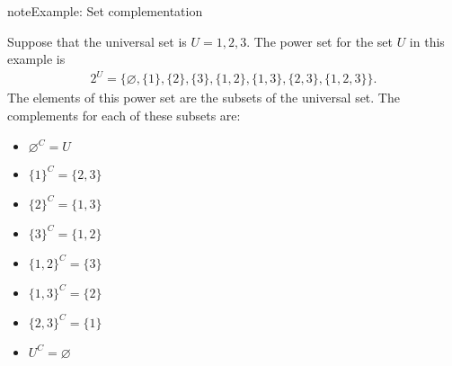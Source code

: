 \documentclass[letterpaper,10pt,english]{jupyterBook}
\begin{document}
\begin{sphinxadmonition}{note}{Example: Set complementation}

\sphinxAtStartPar
Suppose that the universal set is \(U = {1, 2, 3}\). The power set for the set \(U\) in this example is
\begin{equation*}
\begin{split}2^U = \{\varnothing, \{1\} , \{2\} , \{3\} , \{1, 2\} , \{1, 3\} , \{2, 3\} , \{1, 2, 3\}\} .\end{split}
\end{equation*}
\sphinxAtStartPar
The elements of this power set are the subsets of the universal set. The complements for each of these subsets are:
\begin{itemize}
\item {} 
\sphinxAtStartPar
\(\varnothing^C = U\)

\item {} 
\sphinxAtStartPar
\(\{1\}^C = \{2, 3\}\)

\item {} 
\sphinxAtStartPar
\(\{2\}^C = \{1, 3\}\)

\item {} 
\sphinxAtStartPar
\(\{3\}^C = \{1, 2\}\)

\item {} 
\sphinxAtStartPar
\(\{1, 2\}^C = \{3\}\)

\item {} 
\sphinxAtStartPar
\(\{1, 3\}^C = \{2\}\)

\item {} 
\sphinxAtStartPar
\(\{2, 3\}^C = \{1\}\)

\item {} 
\sphinxAtStartPar
\(U^C = \varnothing\)

\end{itemize}
\end{sphinxadmonition}
\end{document}
